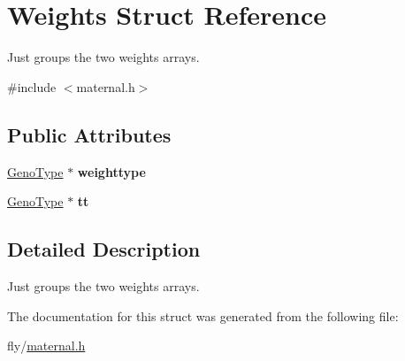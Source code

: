 \hypertarget{structWeights}{
\section{Weights Struct Reference}
\label{structWeights}
}


Just groups the two weights arrays.  


{\ttfamily \#include $<$maternal.h$>$}\subsection*{Public Attributes}
\begin{DoxyCompactItemize}
\item 
\hypertarget{structWeights_a5cdfeb7fda58eed6b76806b61c0d7132}{
\hyperlink{structGenoType}{GenoType} $\ast$ {\bfseries weighttype}}
\label{structWeights_a5cdfeb7fda58eed6b76806b61c0d7132}

\item 
\hypertarget{structWeights_ad408458ba93474aaab3356978d463c23}{
\hyperlink{structGenoType}{GenoType} $\ast$ {\bfseries tt}}
\label{structWeights_ad408458ba93474aaab3356978d463c23}

\end{DoxyCompactItemize}


\subsection{Detailed Description}
Just groups the two weights arrays. 

The documentation for this struct was generated from the following file:\begin{DoxyCompactItemize}
\item 
fly/\hyperlink{maternal_8h}{maternal.h}\end{DoxyCompactItemize}
